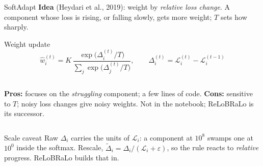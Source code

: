 \documentclass[aspectratio=169,11pt]{beamer}
\begin{document}
\begin{frame}{SoftAdapt}
\small
\textbf{Idea} (Heydari et al., 2019): weight by \emph{relative loss change}. A component whose loss is rising, or falling slowly, gets more weight; $T$ sets how sharply.

\vspace{0.1cm}
\begin{block}{Weight update}
\vspace{-0.15cm}
\[
    \hat{w}_i^{(t)} = K \, \frac{\exp\!\bigl(\Delta_i^{(t)} / T\bigr)}{\sum_{j} \exp\!\bigl(\Delta_j^{(t)} / T\bigr)},
    \qquad \Delta_i^{(t)} = \mathcal{L}_i^{(t)} - \mathcal{L}_i^{(t-1)}
\]
\end{block}

\vspace{0.1cm}
\begin{columns}[T]
\textbf{Pros:} focuses on the \emph{struggling} component; a few lines of code.
\textbf{Cons:} sensitive to $T$; noisy loss changes give noisy weights. Not in the notebook; ReLoBRaLo is its successor.
\end{columns}

\vspace{0.15cm}
\begin{alertblock}{Scale caveat}
\footnotesize
Raw $\Delta_i$ carries the units of $\mathcal{L}_i$: a component at $10^{8}$ swamps one at $10^{0}$ inside the softmax. Rescale, $\tilde\Delta_i = \Delta_i / (\mathcal{L}_i + \varepsilon)$, so the rule reacts to \emph{relative} progress. ReLoBRaLo builds that in.
\end{alertblock}
\end{frame}
\end{document}
